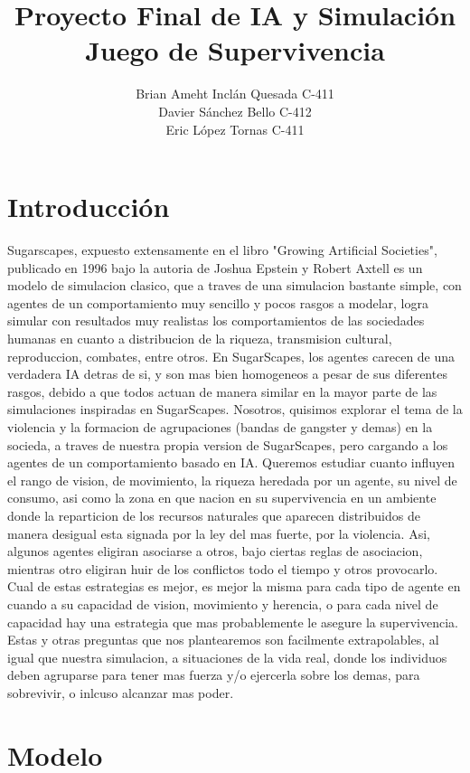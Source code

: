 \documentclass[11pt]{article}
\author{Brian Ameht Inclán Quesada C-411\\ Davier Sánchez Bello C-412\\ Eric López Tornas C-411}
\title{Proyecto Final de IA y Simulación \\ Juego de Supervivencia}
\date{}
\begin{document}
\maketitle
\newpage

\tableofcontents
\newpage

\section{Introducción}
Sugarscapes, expuesto extensamente en el libro "Growing Artificial Societies", publicado en 1996 bajo la autoria de Joshua Epstein y Robert Axtell es un modelo de simulacion clasico, que a traves de una simulacion bastante simple, con agentes de un comportamiento muy sencillo y pocos rasgos a modelar, logra simular con resultados muy realistas los comportamientos de las sociedades humanas en cuanto a distribucion de la riqueza, transmision cultural, reproduccion, combates, entre otros.
En SugarScapes, los agentes carecen de una verdadera IA detras de si, y son mas bien homogeneos a pesar de sus diferentes rasgos, debido a que todos actuan de manera similar en la mayor parte de las simulaciones inspiradas en SugarScapes.
Nosotros, quisimos explorar el tema de la violencia y la formacion de agrupaciones (bandas de gangster y demas) en la socieda, a traves de nuestra propia version de SugarScapes, pero cargando a los agentes de un comportamiento basado en IA. Queremos estudiar cuanto influyen el rango de vision, de movimiento, la riqueza heredada por un agente, su nivel de consumo, asi como la zona en que nacion en su supervivencia en un ambiente donde la reparticion de los recursos naturales que aparecen distribuidos de manera desigual esta signada por la ley del mas fuerte, por la violencia. Asi, algunos agentes eligiran asociarse a otros, bajo ciertas reglas de asociacion, mientras otro eligiran huir de los conflictos todo el tiempo y otros provocarlo. Cual de estas estrategias es mejor, es mejor la misma para cada tipo de agente en cuando a su capacidad de vision, movimiento y herencia, o para cada nivel de capacidad hay una estrategia que mas probablemente le asegure la supervivencia. Estas y otras preguntas que nos plantearemos son facilmente extrapolables, al igual que nuestra simulacion, a situaciones de la vida real, donde los individuos deben agruparse para tener mas fuerza y/o ejercerla sobre los demas, para sobrevivir, o inlcuso alcanzar mas poder.

\section{Modelo}
\end{document}
